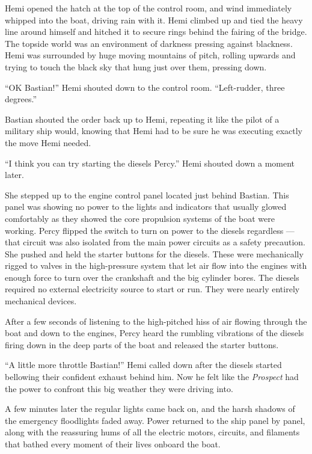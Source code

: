 \documentclass[]{scrbook}
\begin{document}
Hemi opened the hatch at the top of the control room, and wind
immediately whipped into the boat, driving rain with it. Hemi climbed up
and tied the heavy line around himself and hitched it to secure rings
behind the fairing of the bridge. The topside world was an environment
of darkness pressing against blackness. Hemi was surrounded by huge
moving mountains of pitch, rolling upwards and trying to touch the black
sky that hung just over them, pressing down.

``OK Bastian!'' Hemi shouted down to the control room. ``Left-rudder,
three degrees.''

Bastian shouted the order back up to Hemi, repeating it like the pilot
of a military ship would, knowing that Hemi had to be sure he was
executing exactly the move Hemi needed.

``I think you can try starting the diesels Percy.'' Hemi shouted down a
moment later.

She stepped up to the engine control panel located just behind Bastian.
This panel was showing no power to the lights and indicators that
usually glowed comfortably as they showed the core propulsion systems of
the boat were working. Percy flipped the switch to turn on power to the
diesels regardless --- that circuit was also isolated from the main
power circuits as a safety precaution. She pushed and held the starter
buttons for the diesels. These were mechanically rigged to valves in the
high-pressure system that let air flow into the engines with enough
force to turn over the crankshaft and the big cylinder bores. The
diesels required no external electricity source to start or run. They
were nearly entirely mechanical devices.

After a few seconds of listening to the high-pitched hiss of air flowing
through the boat and down to the engines, Percy heard the rumbling
vibrations of the diesels firing down in the deep parts of the boat and
released the starter buttons.

``A little more throttle Bastian!'' Hemi called down after the diesels
started bellowing their confident exhaust behind him. Now he felt like
the \emph{Prospect} had the power to confront this big weather they were
driving into.

A few minutes later the regular lights came back on, and the harsh
shadows of the emergency floodlights faded away. Power returned to the
ship panel by panel, along with the reassuring hums of all the electric
motors, circuits, and filaments that bathed every moment of their lives
onboard the boat.
\end{document}
